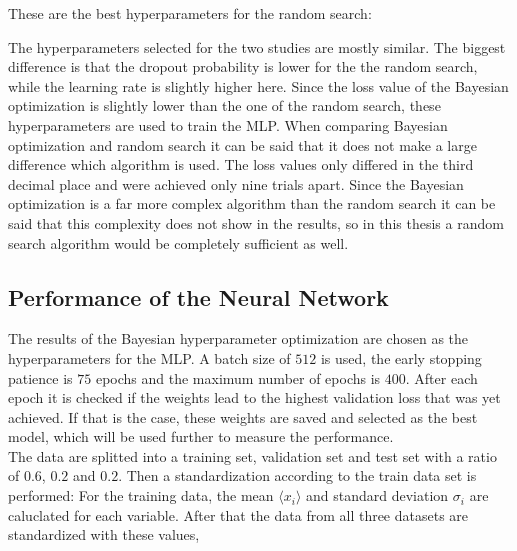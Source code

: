 These are the best hyperparameters for the random search:


The hyperparameters selected for the two studies are mostly similar. The biggest difference is that the dropout probability is lower for the the random search, while the learning rate is slightly higher here. 
Since the loss value of the Bayesian optimization is slightly lower than the one of the random search, these hyperparameters are used to train the MLP.
When comparing Bayesian optimization and random search it can be said that it does not make a large difference which algorithm is used. The loss values only differed in the third decimal place
and were achieved only nine trials apart. Since the Bayesian optimization is a far more complex algorithm than the random search it can be said that this complexity does not show in the results,
so in this thesis a random search algorithm would be completely sufficient as well.

\subsection{Performance of the Neural Network}
\label{subsec:perfgat}

The results of the Bayesian hyperparameter optimization are chosen as the hyperparameters for the MLP. A batch size of $512$ is used, the early stopping patience is $75$ epochs and the maximum
number of epochs is $400$. After each epoch it is checked if the weights lead to the highest validation loss that was yet achieved. If that is the case, these weights are saved and selected as the best model,
which will be used further to measure the performance. \\

The data are splitted into a training set, validation set and test set with a ratio of $0.6$, $0.2$ and $0.2$. Then a standardization according to the train data set is performed: For the training data,
the mean $\langle x_i \rangle$ and standard deviation $\sigma_i$ are caluclated for each variable. After that the data from all three datasets are standardized with these values,

